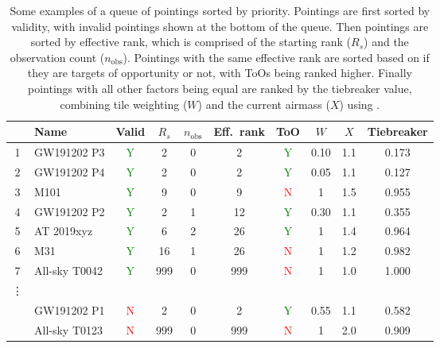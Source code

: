 \begin{colsection}

\begin{table}[t]
    \begin{center}
        \begin{tabular}{c|l|c|ccc|c|ccc} %
            & Name & Valid & $R_s$ & $n_\text{obs}$ & Eff.\ rank & ToO & $W$ & $X$ & Tiebreaker \\
            \midrule
            1 & GW191202 P3   & \textcolor{Green}{Y} &  2  & 0 &   2 & \textcolor{Green}{Y} & 0.10 & 1.1 & 0.173 \\
            2 & GW191202 P4   & \textcolor{Green}{Y} &  2  & 0 &   2 & \textcolor{Green}{Y} & 0.05 & 1.1 & 0.127 \\
            3 &         M101  & \textcolor{Green}{Y} &  9  & 0 &   9 &   \textcolor{Red}{N} &    1 & 1.5 & 0.955 \\
            4 & GW191202 P2   & \textcolor{Green}{Y} &  2  & 1 &  12 & \textcolor{Green}{Y} & 0.30 & 1.1 & 0.355 \\
            5 &   AT 2019xyz  & \textcolor{Green}{Y} &  6  & 2 &  26 & \textcolor{Green}{Y} &    1 & 1.4 & 0.964 \\
            6 &          M31  & \textcolor{Green}{Y} &  16 & 1 &  26 &   \textcolor{Red}{N} &    1 & 1.2 & 0.982 \\
            7 & All-sky T0042 & \textcolor{Green}{Y} & 999 & 0 & 999 &   \textcolor{Red}{N} &    1 & 1.0 & 1.000 \\
            \vdots & & & & & & \\
              &  GW191202 P1  &   \textcolor{Red}{N} &   2 & 0 &   2 & \textcolor{Green}{Y} & 0.55 & 1.1 & 0.582 \\
              & All-sky T0123 &   \textcolor{Red}{N} & 999 & 0 & 999 &   \textcolor{Red}{N} &    1 & 2.0 & 0.909 \\
        \end{tabular}
    \end{center}
    \caption[Examples of sorting pointings by priority]{
        Some examples of a queue of pointings sorted by priority. Pointings are first sorted by validity, with invalid pointings shown at the bottom of the queue. Then pointings are sorted by effective rank, which is comprised of the starting rank ($R_s$) and the observation count ($n_\text{obs}$). Pointings with the same effective rank are sorted based on if they are targets of opportunity or not, with ToOs being ranked higher. Finally pointings with all other factors being equal are ranked by the tiebreaker value, combining tile weighting ($W$) and the current airmass ($X$) using .
    }\label{tab:priority}
\end{table}


\end{colsection}
